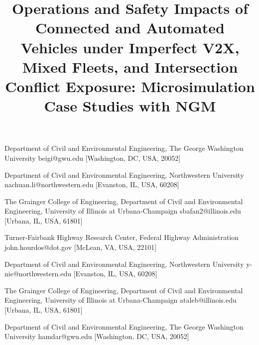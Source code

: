 \documentclass[numbered]{trbunofficial}
\begin{document}
\title{Operations and Safety Impacts of Connected and Automated Vehicles under
Imperfect V2X, Mixed Fleets, and Intersection Conflict Exposure:
Microsimulation Case Studies with NGM}

{Department of Civil and Environmental Engineering, The George Washington University}
{beigi@gwu.edu}
[Washington, DC, USA, 20052]

{Department of Civil and Environmental Engineering, Northwestern University}
{nachuan.li@northwestern.edu}
[Evanston, IL, USA, 60208]

{The Grainger College of Engineering, Department of Civil and Environmental Engineering,
University of Illinois at Urbana-Champaign}
{sbafan2@illinois.edu}
[Urbana, IL, USA, 61801]

{Turner-Fairbank Highway Research Center, Federal Highway Administration}
{john.hourdos@dot.gov}
[McLean, VA, USA, 22101]

{Department of Civil and Environmental Engineering, Northwestern University}
{y-nie@northwestern.edu}
[Evanston, IL, USA, 60208]

{The Grainger College of Engineering, Department of Civil and Environmental Engineering,
University of Illinois at Urbana-Champaign}
{ataleb@illinois.edu}
[Urbana, IL, USA, 61801]

{Department of Civil and Environmental Engineering, The George Washington University}
{hamdar@gwu.edu}
[Washington, DC, USA, 20052]


\maketitle

\end{document}
